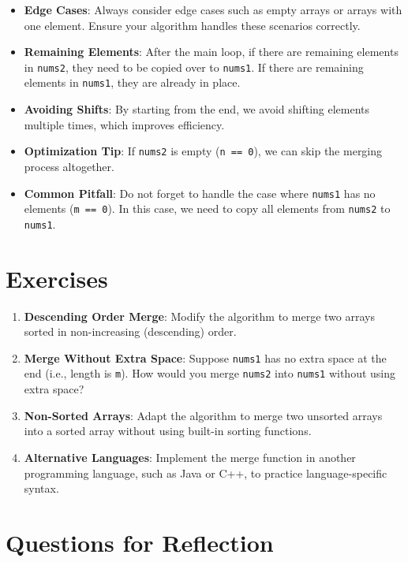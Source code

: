 \begin{itemize}
    \item \textbf{Edge Cases}: Always consider edge cases such as empty arrays or arrays with one element. Ensure your algorithm handles these scenarios correctly.
    \item \textbf{Remaining Elements}: After the main loop, if there are remaining elements in \texttt{nums2}, they need to be copied over to \texttt{nums1}. If there are remaining elements in \texttt{nums1}, they are already in place.
    \item \textbf{Avoiding Shifts}: By starting from the end, we avoid shifting elements multiple times, which improves efficiency.
    \item \textbf{Optimization Tip}: If \texttt{nums2} is empty (\texttt{n == 0}), we can skip the merging process altogether.
    \item \textbf{Common Pitfall}: Do not forget to handle the case where \texttt{nums1} has no elements (\texttt{m == 0}). In this case, we need to copy all elements from \texttt{nums2} to \texttt{nums1}.
\end{itemize}

\section*{Exercises}

\begin{enumerate}
    \item \textbf{Descending Order Merge}: Modify the algorithm to merge two arrays sorted in non-increasing (descending) order.
    \item \textbf{Merge Without Extra Space}: Suppose \texttt{nums1} has no extra space at the end (i.e., length is \texttt{m}). How would you merge \texttt{nums2} into \texttt{nums1} without using extra space?
    \item \textbf{Non-Sorted Arrays}: Adapt the algorithm to merge two unsorted arrays into a sorted array without using built-in sorting functions.
    \item \textbf{Alternative Languages}: Implement the merge function in another programming language, such as Java or C++, to practice language-specific syntax.
\end{enumerate}

\section*{Questions for Reflection}

